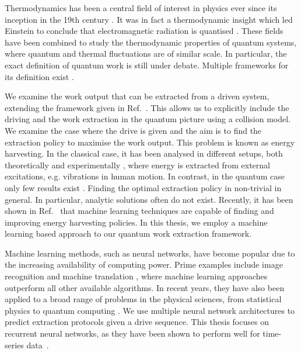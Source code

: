 Thermodynamics has been a central field of interest in physics ever since its inception in the 19th century \cite{thomson_2011}.
It was in fact a thermodynamic insight which led Einstein to conclude that electromagnetic radiation is quantised \cite{1905AnP...322..132E}.
These fields have been combined to study the thermodynamic properties of quantum systems, where quantum and thermal fluctuations are of similar scale.
In particular, the exact definition of quantum work is still under debate.
Multiple frameworks for its definition exist \cite{Egloff_2015, PhysRevE.93.022131}.

We examine the work output that can be extracted from a driven system, extending the framework given in Ref.~\cite{beyer2020}.
This allows us to explicitly include the driving and the work extraction in the quantum picture using a collision model.
We examine the case where the drive is given and the aim is to find the extraction policy to maximise the work output.
This problem is known as energy harvesting.
In the classical case, it has been analysed in different setups, both theoretically \cite{WEI20171} and experimentally \cite{expharv}, where energy is extracted from external excitations, e.g. vibrations in human motion.
In contrast, in the quantum case only few results exist \cite{sothmann}.
Finding the optimal extraction policy in non-trivial in general.
In particular, analytic solutions often do not exist.
Recently, it has been shown in Ref.~\cite{Liu2019} that machine learning techniques are capable of finding and improving energy harvesting policies.
In this thesis, we employ a machine learning based approach to our quantum work extraction framework.

Machine learning methods, such as neural networks, have become popular due to the increasing availability of computing power.
Prime examples include image recognition and machine translation \cite{DBLP:journals/corr/VaswaniSPUJGKP17}, where machine learning approaches outperform all other available algorithms.
In recent years, they have also been applied to a broad range of problems in the physical sciences, from statistical physics to quantum computing \cite{Carleo_2019, wise2021using}.
We use multiple neural network architectures to predict extraction protocols given a drive sequence.
This thesis focuses on recurrent neural networks, as they have been shown to perform well for time-series data~\cite{8614252}.

